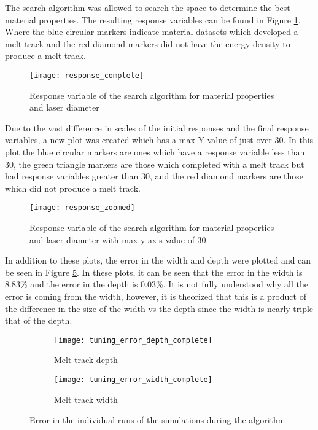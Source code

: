 \label{results}

The search algorithm was allowed to search the space to determine the best material properties.  The resulting response variables can be found in Figure \ref{fig:response_complete}.  Where the blue circular markers indicate material datasets which developed a melt track and the red diamond markers did not have the energy density to produce a melt track.
\begin{figure}[!htb]
	\centering
	\texttt{[image: response\_complete]}
	\caption{Response variable of the search algorithm for material properties and laser diameter }
	\label{fig:response_complete}
\end{figure}
Due to the vast difference in scales of the initial responses and the final response variables, a new plot was created which has a max Y value of just over 30.  In this plot the blue circular markers are ones which have a response variable less than 30, the green triangle markers are those which completed with a melt track but had response variables greater than 30, and the red diamond markers are those which did not produce a melt track.
\begin{figure}[!htb]
	\centering
	\texttt{[image: response\_zoomed]}
	\caption{Response variable of the search algorithm for material properties and laser diameter with max y axis value of 30 }
	\label{fig:response_zoomed}
\end{figure}
In addition to these plots, the error in the width and depth were plotted and can be seen in Figure \ref{fig:tuning_error_complete}.  In these plots, it can be seen that the error in the width is 8.83\% and the error in the depth is 0.03\%.  It is not fully understood why all the error is coming from the width, however, it is theorized that this is a product of the difference in the size of the width vs the depth since the width is nearly triple that of the depth.
\begin{figure}[!htb]\centering
	\begin{subfigure}[c]{0.475\textwidth}\centering
	\texttt{[image: tuning\_error\_depth\_complete]}
	\caption{Melt track depth}
	\label{fig:tuning_error_depth_complete}
	\end{subfigure}\hfill{}
		\begin{subfigure}[c]{0.475\textwidth}\centering
		\texttt{[image: tuning\_error\_width\_complete]}
		\caption{Melt track width}
		\label{fig:tuning_error_width_complete}
		\end{subfigure}
	\caption{Error in the individual runs of the simulations during the  algorithm}
	\label{fig:tuning_error_complete}
\end{figure}

